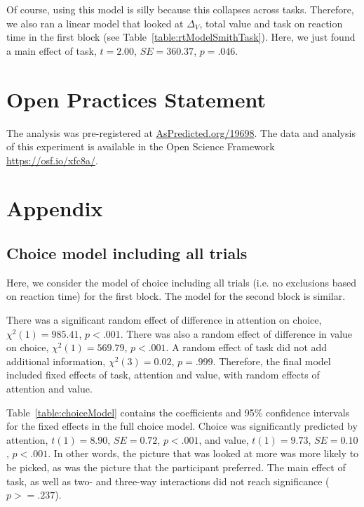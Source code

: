 \documentclass[12pt]{article}
\begin{document}
Of course, using this model is silly because this collapses across tasks. Therefore, we also ran a linear model that looked at $\Delta_V$, total value and task on reaction time in the first block (see Table~\ref{table:rtModelSmithTask}). Here, we just found a main effect of task, $t=2.00$, $SE=360.37$, $p=.046$.


\clearpage
\section{Open Practices Statement}
The analysis was pre-registered at \url{AsPredicted.org/19698}. The data and analysis of this experiment is available in the Open Science Framework \url{https://osf.io/xfc8a/}. 




\clearpage
\section{Appendix}
\subsection{Choice model including all trials}
Here, we consider the model of choice including all trials (i.e. no exclusions based on reaction time) for the first block. The model for the second block is similar. 

There was a significant random effect of difference in attention on choice, $\chi^2(1)=985.41$, $p<.001$. There was also a random effect of difference in value on choice, $\chi^2(1)=569.79$, $p<.001$. A random effect of task did not add additional information, $\chi^2(3)=0.02$, $p=.999$. Therefore, the final model included fixed effects of task, attention and value, with random effects of attention and value.



Table~\ref{table:choiceModel} contains the coefficients and 95\% confidence intervals for the fixed effects in the full choice model. Choice was significantly predicted by attention, $t(1)=8.90$, $SE=0.72$, $p<.001$, and value, $t(1)=9.73$, $SE=0.10$, $p<.001$. In other words, the picture that was looked at more was more likely to be picked, as was the picture that the participant preferred. The main effect of task, as well as two- and three-way interactions did not reach significance ($p>=.237$).



\clearpage
\newpage


\end{document}
